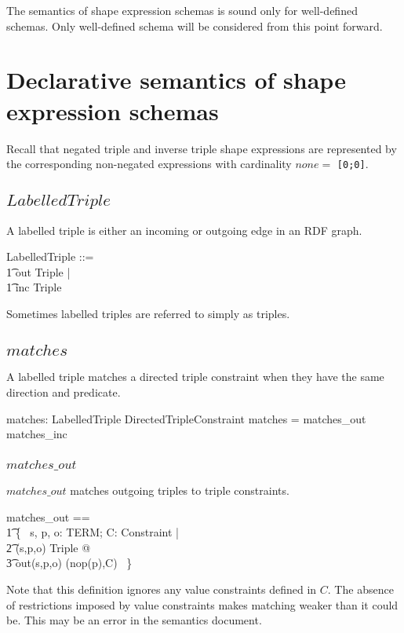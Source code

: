 \documentclass{article}
\begin{document}
The semantics of shape expression schemas is sound only for well-defined schemas.
Only well-defined schema will be considered from this point forward.

\section{Declarative semantics of shape expression schemas}
Recall that negated triple and inverse triple shape expressions are represented by the corresponding non-negated expressions with cardinality
$none =$ {\tt [0;0]}.

\subsection{$LabelledTriple$}
A labelled triple is either an incoming or outgoing edge in an RDF graph.
\begin{zed}
	LabelledTriple ::= \\
\t1		out \ldata Triple \rdata | \\
\t1		inc \ldata Triple \rdata
\end{zed}

Sometimes labelled triples are referred to simply as triples.

\subsection{$matches$}
A labelled triple matches a directed triple constraint when they have the same direction and predicate.
\begin{axdef}
	matches: LabelledTriple \rel DirectedTripleConstraint
\where
	matches = matches\_out \cup matches\_inc
\end{axdef}

\subsubsection{$matches\_out$}
$matches\_out$ matches outgoing triples to triple constraints.
\begin{zed}
	matches\_out == \\
\t1		\{~ s, p, o: TERM; C: Constraint | \\
\t2			(s,p,o) \in Triple @ \\
\t3				out(s,p,o) \mapsto (nop(p),C) ~\}
\end{zed}

Note that this definition ignores any value constraints defined in $C$.
The absence of restrictions imposed by value constraints makes matching weaker than it could be.
This may be an error in the semantics document.
\end{document}
